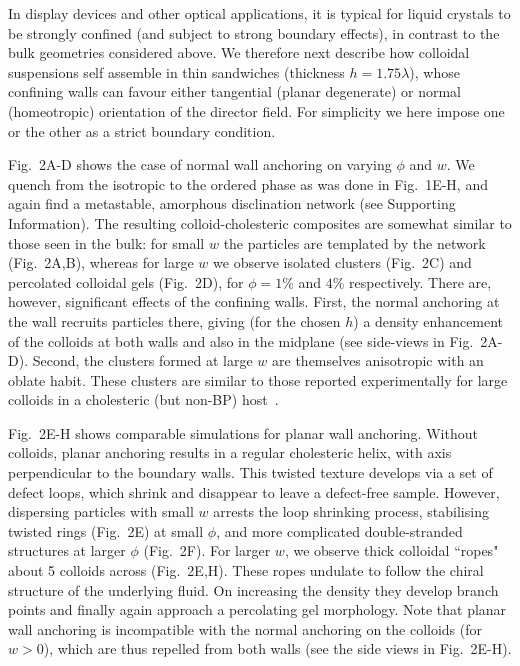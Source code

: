 \documentclass[12pt]{article}
\begin{document}
In display devices and other optical applications, it is typical for liquid crystals to be strongly confined (and subject to strong boundary effects), in contrast to the bulk geometries considered above. We therefore next describe how colloidal suspensions self assemble in thin sandwiches (thickness $h = 1.75 \lambda$), whose confining walls can favour either tangential (planar degenerate) or normal (homeotropic) orientation of the director field. For simplicity we here impose one or the other as a strict boundary condition.

Fig.~2A-D shows the case of normal wall anchoring on varying $\phi$ and $w$. We quench from the isotropic to the ordered phase as was done in Fig.~1E-H, and again find a metastable, amorphous disclination network (see Supporting Information). The resulting colloid-cholesteric composites are somewhat similar to those seen in the bulk: for small $w$ the particles are templated by the network (Fig.~2A,B), whereas for large $w$ we observe isolated clusters (Fig.~2C) and percolated colloidal gels (Fig.~2D), for $\phi = 1\%$ and $4\%$ respectively. There are, however, significant effects of the confining walls.
First, the normal anchoring at the wall recruits particles there,  giving (for the chosen $h$) a density enhancement of the colloids at both walls and also in the midplane (see side-views in Fig.~2A-D). Second, the clusters formed at large $w$ are themselves anisotropic with an oblate habit. These clusters
are similar to those reported experimentally for large colloids in a
cholesteric (but non-BP) host~\cite{niek}.
 
Fig.~2E-H shows comparable simulations for planar wall anchoring. 
Without colloids, planar anchoring results in a regular cholesteric helix,
with axis perpendicular to the boundary walls. 
This twisted texture develops via a set of defect loops,
which shrink and disappear to leave a defect-free sample. However,
dispersing particles with small $w$ arrests the loop shrinking process,
stabilising twisted rings (Fig.~2E) at small $\phi$, and more complicated 
double-stranded structures at larger $\phi$ (Fig.~2F).
For larger $w$, we observe thick colloidal ``ropes" about 5 colloids across
(Fig.~2E,H). These ropes undulate to follow the chiral structure of the 
underlying fluid. On increasing the density they develop branch points and finally again approach a percolating gel morphology. Note that planar wall anchoring is incompatible with the normal anchoring on the colloids (for $w>0$), which are thus repelled from both walls (see the side views in Fig.~2E-H).
\end{document}
